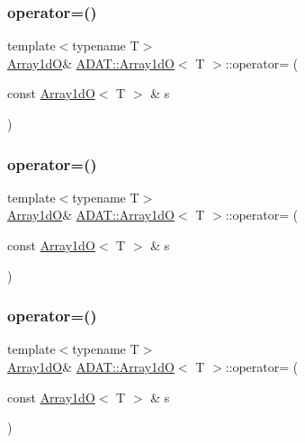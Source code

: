 \subsubsection{\texorpdfstring{operator=()}{operator=()}\hspace{0.1cm}{\footnotesize\ttfamily [1/3]}}
{\footnotesize\ttfamily template$<$typename T$>$ \\
\mbox{\hyperlink{classADAT_1_1Array1dO}{Array1dO}}\& \mbox{\hyperlink{classADAT_1_1Array1dO}{A\+D\+A\+T\+::\+Array1dO}}$<$ T $>$\+::operator= (\begin{DoxyParamCaption}\item[{const \mbox{\hyperlink{classADAT_1_1Array1dO}{Array1dO}}$<$ T $>$ \&}]{s }\end{DoxyParamCaption})\hspace{0.3cm}{\ttfamily [inline]}}

\mbox{\label{classADAT_1_1Array1dO_a387ca64e93f23d140b38bd42e81d05a8}} 
\subsubsection{\texorpdfstring{operator=()}{operator=()}\hspace{0.1cm}{\footnotesize\ttfamily [2/3]}}
{\footnotesize\ttfamily template$<$typename T$>$ \\
\mbox{\hyperlink{classADAT_1_1Array1dO}{Array1dO}}\& \mbox{\hyperlink{classADAT_1_1Array1dO}{A\+D\+A\+T\+::\+Array1dO}}$<$ T $>$\+::operator= (\begin{DoxyParamCaption}\item[{const \mbox{\hyperlink{classADAT_1_1Array1dO}{Array1dO}}$<$ T $>$ \&}]{s }\end{DoxyParamCaption})\hspace{0.3cm}{\ttfamily [inline]}}

\mbox{\label{classADAT_1_1Array1dO_a387ca64e93f23d140b38bd42e81d05a8}} 
\subsubsection{\texorpdfstring{operator=()}{operator=()}\hspace{0.1cm}{\footnotesize\ttfamily [3/3]}}
{\footnotesize\ttfamily template$<$typename T$>$ \\
\mbox{\hyperlink{classADAT_1_1Array1dO}{Array1dO}}\& \mbox{\hyperlink{classADAT_1_1Array1dO}{A\+D\+A\+T\+::\+Array1dO}}$<$ T $>$\+::operator= (\begin{DoxyParamCaption}\item[{const \mbox{\hyperlink{classADAT_1_1Array1dO}{Array1dO}}$<$ T $>$ \&}]{s }\end{DoxyParamCaption})\hspace{0.3cm}{\ttfamily [inline]}}

